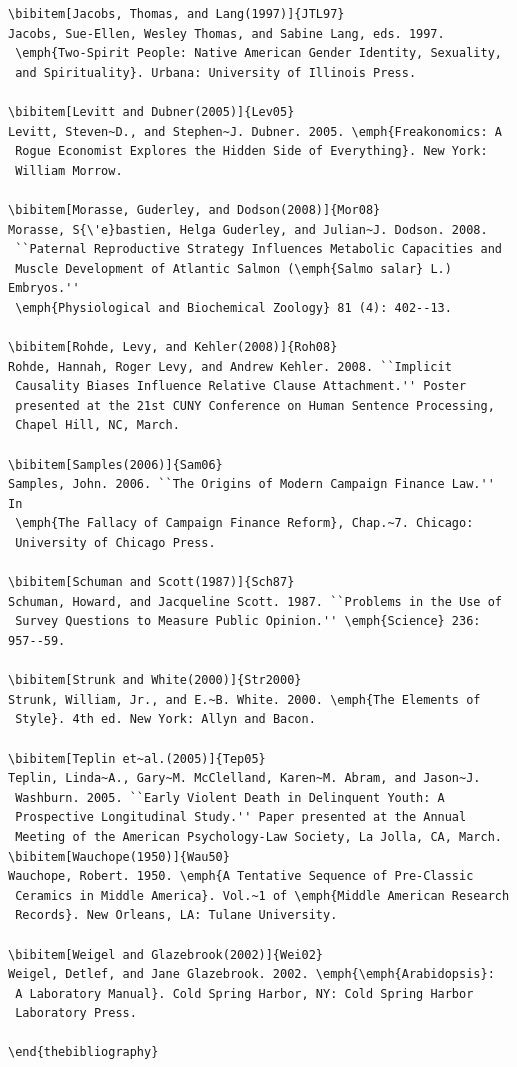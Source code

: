 \documentclass[]{interact}
\theoremstyle{plain}%
\theoremstyle{definition}
\theoremstyle{remark}
\begin{document}
\begin{verbatim}
\bibitem[Jacobs, Thomas, and Lang(1997)]{JTL97}
Jacobs, Sue-Ellen, Wesley Thomas, and Sabine Lang, eds. 1997.
 \emph{Two-Spirit People: Native American Gender Identity, Sexuality,
 and Spirituality}. Urbana: University of Illinois Press.

\bibitem[Levitt and Dubner(2005)]{Lev05}
Levitt, Steven~D., and Stephen~J. Dubner. 2005. \emph{Freakonomics: A
 Rogue Economist Explores the Hidden Side of Everything}. New York:
 William Morrow.

\bibitem[Morasse, Guderley, and Dodson(2008)]{Mor08}
Morasse, S{\'e}bastien, Helga Guderley, and Julian~J. Dodson. 2008.
 ``Paternal Reproductive Strategy Influences Metabolic Capacities and
 Muscle Development of Atlantic Salmon (\emph{Salmo salar} L.) Embryos.''
 \emph{Physiological and Biochemical Zoology} 81 (4): 402--13.

\bibitem[Rohde, Levy, and Kehler(2008)]{Roh08}
Rohde, Hannah, Roger Levy, and Andrew Kehler. 2008. ``Implicit
 Causality Biases Influence Relative Clause Attachment.'' Poster
 presented at the 21st CUNY Conference on Human Sentence Processing,
 Chapel Hill, NC, March.

\bibitem[Samples(2006)]{Sam06}
Samples, John. 2006. ``The Origins of Modern Campaign Finance Law.'' In
 \emph{The Fallacy of Campaign Finance Reform}, Chap.~7. Chicago:
 University of Chicago Press.

\bibitem[Schuman and Scott(1987)]{Sch87}
Schuman, Howard, and Jacqueline Scott. 1987. ``Problems in the Use of
 Survey Questions to Measure Public Opinion.'' \emph{Science} 236: 957--59.

\bibitem[Strunk and White(2000)]{Str2000}
Strunk, William, Jr., and E.~B. White. 2000. \emph{The Elements of
 Style}. 4th ed. New York: Allyn and Bacon.

\bibitem[Teplin et~al.(2005)]{Tep05}
Teplin, Linda~A., Gary~M. McClelland, Karen~M. Abram, and Jason~J.
 Washburn. 2005. ``Early Violent Death in Delinquent Youth: A
 Prospective Longitudinal Study.'' Paper presented at the Annual
 Meeting of the American Psychology-Law Society, La Jolla, CA, March.
\bibitem[Wauchope(1950)]{Wau50}
Wauchope, Robert. 1950. \emph{A Tentative Sequence of Pre-Classic
 Ceramics in Middle America}. Vol.~1 of \emph{Middle American Research
 Records}. New Orleans, LA: Tulane University.

\bibitem[Weigel and Glazebrook(2002)]{Wei02}
Weigel, Detlef, and Jane Glazebrook. 2002. \emph{\emph{Arabidopsis}:
 A Laboratory Manual}. Cold Spring Harbor, NY: Cold Spring Harbor
 Laboratory Press.

\end{thebibliography}
\end{verbatim}
\end{document}
